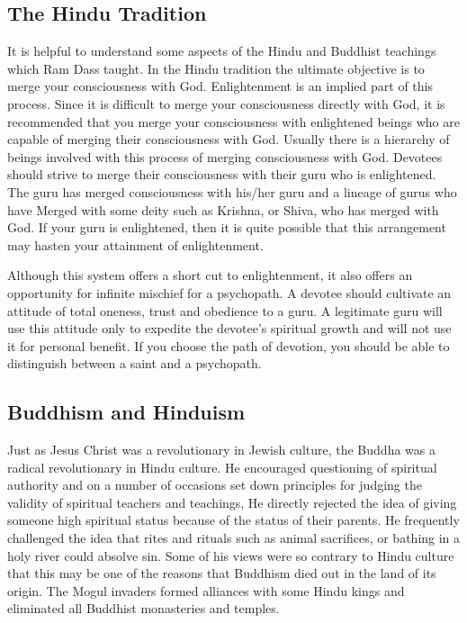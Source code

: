 \documentclass[a5paper,10pt,english]{book}
\begin{document}
\subsection{The Hindu Tradition}
\label{\detokenize{psychopaths:the-hindu-tradition}}
\sphinxAtStartPar
It is helpful to understand some aspects of the Hindu and Buddhist
teachings which Ram Dass taught. In the Hindu tradition the ultimate
objective is to merge your consciousness with God. Enlightenment is an
implied part of this process. Since it is difficult to merge your
consciousness directly with God, it is recommended that you merge your
consciousness with enlightened beings who are capable of merging their
consciousness with God. Usually there is a hierarchy of beings involved
with this process of merging consciousness with God. Devotees should
strive to merge their consciousness with their guru who is enlightened.
The guru has merged consciousness with his/her guru and a lineage of
gurus who have Merged with some deity such as Krishna, or Shiva, who has
merged with God. If your guru is enlightened, then it is quite possible
that this arrangement may hasten your attainment of enlightenment.

\sphinxAtStartPar
Although this system offers a short cut to enlightenment, it also offers
an opportunity for infinite mischief for a psychopath. A devotee should
cultivate an attitude of total oneness, trust and obedience to a guru. A
legitimate guru will use this attitude only to expedite the devotee’s
spiritual growth and will not use it for personal benefit. If you choose
the path of devotion, you should be able to distinguish between a saint
and a psychopath.


\subsection{Buddhism and Hinduism}
\label{\detokenize{psychopaths:buddhism-and-hinduism}}
\sphinxAtStartPar
Just as Jesus Christ was a revolutionary in Jewish culture, the Buddha
was a radical revolutionary in Hindu culture. He encouraged questioning
of spiritual authority and on a number of occasions set down principles
for judging the validity of spiritual teachers and teachings, He
directly rejected the idea of giving someone high spiritual status
because of the status of their parents. He frequently challenged the
idea that rites and rituals such as animal sacrifices, or bathing in a
holy river could absolve sin. Some of his views were so contrary to
Hindu culture that this may be one of the reasons that Buddhism died out
in the land of its origin. The Mogul invaders formed alliances with some
Hindu kings and eliminated all Buddhist monasteries and temples.
\end{document}

